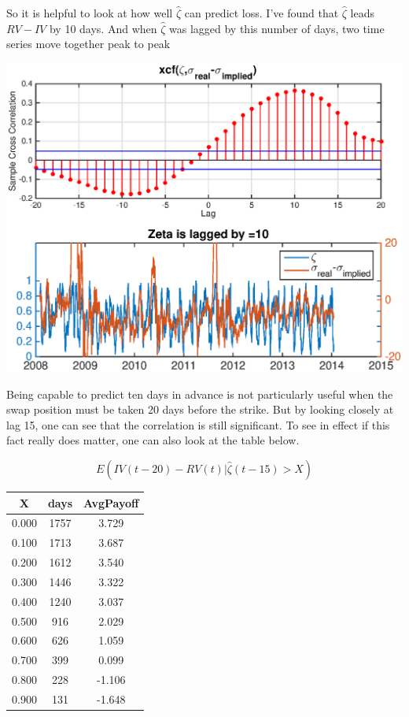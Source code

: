 \documentclass[a4paper]{article}
\begin{document}
So it is helpful to look at how well $\hat{\zeta}$ can predict loss. I've found that $\hat{\zeta}$ leads $RV-IV$ by 10 days. And when $\hat{\zeta}$ was lagged by this number of days, two time series move together peak to peak
 
\includegraphics[width=\textwidth]{zetaleadspread.eps}

Being capable to predict ten days in advance is not particularly useful when the swap position must be taken 20 days before the strike. But by looking closely at lag 15, one can see that the correlation is still significant. To see in effect if this fact really does matter, one can also look at the table below. 


$$
E(IV(t-20)-RV(t) | \hat{\zeta}(t-15) > X)
$$

\begin{center}
\begin{tabular}{ |c|c|c| } 
 \hline
   X    &  days   &  AvgPayoff 	\\
 \hline
 0.000  &   1757  &    3.729	\\
 0.100  &   1713  &    3.687	\\
 0.200  &   1612  &    3.540	\\
 0.300  &   1446  &    3.322	\\
 0.400  &   1240  &    3.037	\\
 0.500  &    916  &    2.029	\\
 0.600  &    626  &    1.059	\\
 0.700  &    399  &    0.099	\\
 0.800  &    228  &   -1.106	\\
 0.900  &    131  &   -1.648	\\
 \hline
\end{tabular}
\end{center}
\end{document}
